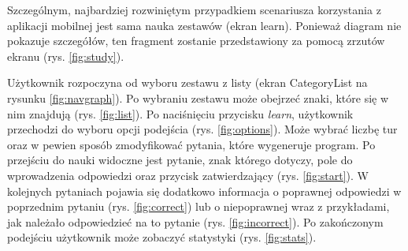 \documentclass[a4paper,twoside,12pt]{book}
\begin{document}
Szczególnym, najbardziej rozwiniętym przypadkiem scenariusza korzystania z aplikacji mobilnej jest sama nauka zestawów (ekran learn). Ponieważ diagram nie pokazuje szczegółów, ten fragment zostanie przedstawiony za pomocą zrzutów ekranu (rys. \ref{fig:study}). 

Użytkownik rozpoczyna od wyboru zestawu z listy (ekran CategoryList na rysunku \ref{fig:navgraph}). Po wybraniu zestawu może obejrzeć znaki, które się w nim znajdują (rys. \ref{fig:list}). Po naciśnięciu przycisku \textit{learn}, użytkownik przechodzi do wyboru opcji podejścia (rys. \ref{fig:options}). Może wybrać liczbę tur oraz w pewien sposób zmodyfikować pytania, które wygeneruje program.  Po przejściu do nauki widoczne jest pytanie, znak którego dotyczy, pole do wprowadzenia odpowiedzi oraz przycisk zatwierdzający (rys. \ref{fig:start}). W kolejnych pytaniach pojawia się dodatkowo informacja o poprawnej odpowiedzi w poprzednim pytaniu (rys. \ref{fig:correct}) lub o niepoprawnej wraz z przykładami, jak należało odpowiedzieć na to pytanie (rys. \ref{fig:incorrect}). Po zakończonym podejściu użytkownik może zobaczyć statystyki (rys. \ref{fig:stats}).


\end{document}

